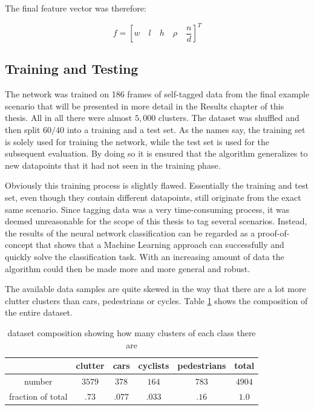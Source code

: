 The final feature vector was therefore:

\begin{equation}
     f = [w\quad l\quad h\quad \rho\quad \frac{n}{d}]^T
\end{equation}

\subsection{Training and Testing}

The network was trained on 186 frames of self-tagged data from the final example scenario that will be presented in more detail in the Results chapter of this thesis.  All in all there were almost $5,000$ clusters. The dataset was shuffled and then split $60/40$ into a training and a test set. As the names say, the training set is solely used for training the network, while the test set is used for the subsequent evaluation. By doing so it is ensured that the algorithm generalizes to new datapoints that it had not seen in the training phase.

Obviously this training process is slightly flawed. Essentially the training and test set, even though they contain different datapoints, still originate from the exact same scenario. Since tagging data was a very time-consuming process, it was deemed unreasonable for the scope of this thesis to tag several scenarios. Instead, the results of the neural network classification can be regarded as a proof-of-concept that shows that a Machine Learning approach can successfully and quickly solve the classification task. With an increasing amount of data the algorithm could then be made more and more general and robust.

The available data samples are quite skewed in the way that there are a lot more clutter clusters than cars, pedestrians or cycles. Table \ref{table:dataset_composition} shows the composition of the entire dataset. 

\begin{table}[H]
\centering
\begin{tabular}{ c | c c c c c}
    & clutter & cars & cyclists & pedestrians & total\\
    \hline
    number & $3579$ & $378$ & $164$ & $783$ & $4904$\\
    fraction of total & $.73$ & $.077$ & $.033$ & $.16$ & $1.0$
\end{tabular}
\vspace{10pt}
\caption{dataset composition showing how many clusters of each class there are}
\label{table:dataset_composition}
\end{table}

